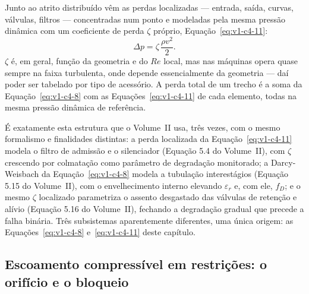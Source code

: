 \documentclass[12pt,a4paper]{article}
\numberwithin{equation}{section}
\numberwithin{table}{section}
\numberwithin{figure}{section}
\begin{document}
Junto ao atrito distribuído vêm as perdas localizadas --- entrada, saída,
curvas, válvulas, filtros --- concentradas num ponto e modeladas pela mesma
pressão dinâmica com um coeficiente de perda $\zeta$ próprio,
Equação~\eqref{eq:v1-c4-11}:
\begin{equation}\label{eq:v1-c4-11}
\Delta p = \zeta\,\frac{\rho v^2}{2}.
\end{equation}
$\zeta$ é, em geral, função da geometria e do $Re$ local, mas nas máquinas
opera quase sempre na faixa turbulenta, onde depende essencialmente da
geometria --- daí poder ser tabelado por tipo de acessório. A perda total de
um trecho é a soma da Equação~\eqref{eq:v1-c4-8} com as
Equações~\eqref{eq:v1-c4-11} de cada elemento, todas na mesma pressão
dinâmica de referência.

É exatamente esta estrutura que o Volume~II usa, três vezes, com o mesmo
formalismo e finalidades distintas: a perda localizada da
Equação~\eqref{eq:v1-c4-11} modela o filtro de admissão e o silenciador
(Equação 5.4 do Volume~II), com $\zeta$ crescendo por colmatação como
parâmetro de degradação monitorado; a Darcy-Weisbach da
Equação~\eqref{eq:v1-c4-8} modela a tubulação interestágios (Equação 5.15 do
Volume~II), com o envelhecimento interno elevando $\varepsilon_r$ e, com ele,
$f_D$; e o mesmo $\zeta$ localizado parametriza o assento desgastado das
válvulas de retenção e alívio (Equação 5.16 do Volume~II), fechando a
degradação gradual que precede a falha binária. Três subsistemas aparentemente
diferentes, uma única origem: as Equações~\eqref{eq:v1-c4-8}
e~\eqref{eq:v1-c4-11} deste capítulo.

\subsection{Escoamento compressível em restrições: o orifício e o
bloqueio}\label{sub:v1-c4-comprimivel}
\end{document}
